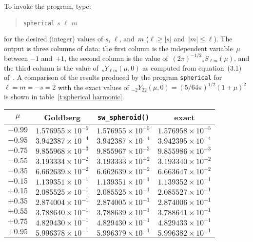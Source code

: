 To invoke the program, type:
\begin{quote}
  \texttt{spherical} $s$ $\ell$ $m$
\end{quote}
for the desired (integer) values of $s$, $\ell$, and~$m$
($\ell\ge|s|$ and~$|m|\le\ell$).  The output is three columns of data: the
first column is the independent variable~$\mu$ between $-1$ and~$+1$, the
second column is the value of~$(2\pi)^{-1/2}{}_sS_{\ell m}(\mu)$, and the
third column is the value of~${}_sY_{\ell m}(\mu,0)$ as computed from
equation~(3.1) of~\cite{goldberg:1967}.  A comparison of the results produced
by the program \texttt{spherical} for $\ell=m=-s=2$ with the exact values
of ${}_{-2}Y_{22}(\mu,0)=(5/64\pi)^{1/2}(1+\mu)^2$ is shown in
table~\ref{t:spherical harmonic}.

\begin{table}[h]
\begin{center}
\begin{tabular}{|cccc|}
  \hline
  $\mu$ & Goldberg & \texttt{sw\_spheroid()} & exact \\
  \hline\hline
  $-0.99$ & $1.576955\times10^{-5}$ & $1.576955\times10^{-5}$ 
          & $1.576958\times10^{-5}$ \\
  $-0.95$ & $3.942387\times10^{-4}$ & $3.942387\times10^{-4}$
          & $3.942395\times10^{-4}$ \\
  $-0.75$ & $9.855968\times10^{-3}$ & $9.855967\times10^{-3}$
          & $9.855986\times10^{-3}$ \\
  $-0.55$ & $3.193334\times10^{-2}$ & $3.193333\times10^{-2}$
          & $3.193340\times10^{-2}$ \\
  $-0.35$ & $6.662639\times10^{-2}$ & $6.662639\times10^{-2}$
          & $6.663647\times10^{-2}$ \\
  $-0.15$ & $1.139351\times10^{-1}$ & $1.139351\times10^{-1}$
          & $1.139352\times10^{-1}$ \\
  $+0.15$ & $2.085525\times10^{-1}$ & $2.085525\times10^{-1}$
          & $2.085527\times10^{-1}$ \\
  $+0.35$ & $2.874004\times10^{-1}$ & $2.874005\times10^{-1}$
          & $2.874006\times10^{-1}$ \\
  $+0.55$ & $3.788640\times10^{-1}$ & $3.788639\times10^{-1}$
          & $3.788641\times10^{-1}$ \\
  $+0.75$ & $4.829430\times10^{-1}$ & $4.829430\times10^{-1}$
          & $4.829433\times10^{-1}$ \\
  $+0.95$ & $5.996378\times10^{-1}$ & $5.996379\times10^{-1}$
          & $5.996382\times10^{-1}$ \\

\end{tabular}
\end{center}
\end{table}
